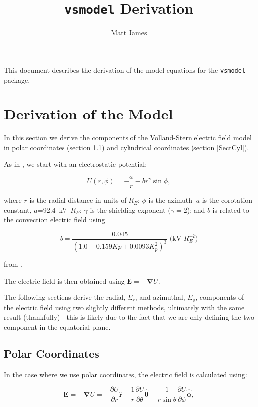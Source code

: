 \documentclass[]{article}
\title{\texttt{vsmodel} Derivation}
\author{Matt James}
\begin{document}
\maketitle

This document describes the derivation of the model equations for the \texttt{vsmodel} package.

\section{Derivation of the Model}

In this section we derive the components of the Volland-Stern electric field model \citep{Volland1973,Stern1975} in polar coordinates (section \ref{SectPol}) and cylindrical coordinates (section \ref{SectCyl}).

As in \citet{Zhao2017}, we start with an electrostatic potential:

\begin{equation}
U(r,\phi) = -\frac{a}{r} - br^\gamma\sin{\phi},
\end{equation}

where $r$ is the radial distance in units of $R_E$; $\phi$ is the azimuth; $a$ is the corotation constant, $a$=92.4~kV~$R_E$; $\gamma$ is the shielding exponent ($\gamma=2$); and $b$ is related to the convection electric field using

\begin{equation}
	b = \frac{0.045}{(1.0 - 0.159 Kp + 0.0093 K_p^2)^3} \text{ (kV $R_E^{-2}$)}
\end{equation}

from \citet{Maynard1975}.

The electric field is then obtained using $\mathbf{E} = - \mathbf{\nabla} U$.

The following sections derive the radial, $E_r$, and azimuthal, $E_\phi$, components of the electric field using two slightly different methods, ultimately with the same result (thankfully) - this is likely due to the fact that we are only defining the two component in the equatorial plane.

\subsection{Polar Coordinates}
	\label{SectPol}
	In the case where we use polar coordinates, the electric field is calculated using:
	
	\begin{equation}
		\mathbf{E} =  - \mathbf{\nabla} U = -\frac{\partial U}{\partial r} \mathbf{\hat{r}} - \frac{1}{r} \frac{\partial U}{\partial \theta} \mathbf{\hat{\theta}} - \frac{1}{r \sin{\theta}} \frac{\partial U}{\partial \phi} \mathbf{\hat{\phi}}, \label{EqDelUP}
	\end{equation}
	
\end{document}
